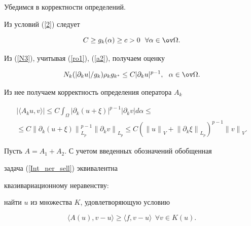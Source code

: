 Убедимся в корректности определений. 


Из условий (\ref{2}) следует


\begin{equation}


C \ge g_k(\alpha) \geq c > 0 \ \ \forall\alpha\in \ov \Omega . 


\label{a2}


\end{equation}


Из (\ref{N3}), учитывая (\ref{ro1}), (\ref{a2}), получаем оценку


$$


N_k (|\partial_k u | / g_k ) \rho_k g_{k^*}


\le C |\partial_k u |^{p-1},\ \ \alpha\in \ov \Omega . 


$$


Из нее получаем корректность определения оператора $A_k$


\begin{multline*}


|\langle A_k u, v \rangle | \le C


\int_\Omega |\partial_k (u+\xi ) |^{p-1} |\partial_k v | d\alpha \le \\


%


\le C {\|\partial_k (u+\xi ) \|}_{L_p}^{p-1}{\|\partial_k v \|}_{L_p} 


\le C ({\| u \|}_V+{\| \partial_k \xi \|}_{L_p})^{p-1} {\| v \|}_V. 




\end{multline*}





Пусть $A=A_1+A_2$. С учетом введенных обозначений обобщенная


задача (\ref{Int_ner_sell}) эквивалентна 


квазивариационному неравенству: 


найти $u$ из множества $K$, удовлетворяющую условию


\begin{equation}


\langle {A(u), v -u} \rangle \geq \langle {f, v-u} \rangle


\ \ \forall v \in K(u).


\label{Var_ner_sell} 


\end{equation}





